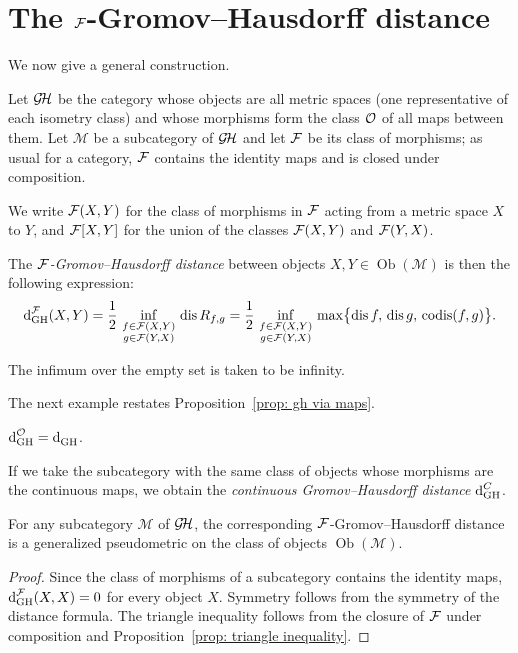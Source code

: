\section{The $\mathcal{F}$-Gromov--Hausdorff distance}\label{sec: f-dist}
We now give a general construction.
\begin{define}\label{definition F distance}
  Let $\operatorname{\mathcal{G\!H}}$ be the category whose objects are all metric spaces (one representative of each isometry class) and whose morphisms form the class $\mathcal{O}$ of all maps between them.
  Let $\mathcal{M}$ be a subcategory of $\operatorname{\mathcal{G\!H}}$ and let $\mathcal{F}$ be its class of morphisms; as usual for a category, $\mathcal{F}$ contains the identity maps and is closed under composition.

We write $\mathcal{F}(X,Y)$ for the class of morphisms in $\mathcal{F}$ acting from a metric space $X$ to $Y$, and $\mathcal{F}[X,Y]$ for the union of the classes $\mathcal{F}(X,Y)$ and $\mathcal{F}(Y,X)$.\par

The \emph{$\mathcal{F}$-Gromov--Hausdorff distance} between objects $X, Y \in \operatorname{Ob}(\mathcal{M})$ is then the following expression:
$$
\operatorname{d}^{\mathcal{F}}_{\mathrm{GH}}(X,Y)=\frac12\,\inf_{\substack{f\in \mathcal{F}(X,Y)\\ g\in \mathcal{F}(Y,X)}}\,\operatorname{dis} R_{f,g}=
\frac12\,\inf_{\substack{f\in \mathcal{F}(X,Y)\\ g\in \mathcal{F}(Y,X)}}\,\max\bigl\{\operatorname{dis} f,\,\operatorname{dis} g,\,\operatorname{codis}(f,g)\bigr\}.
$$

The infimum over the empty set is taken to be infinity.
\end{define}
The next example restates Proposition~\ref{prop: gh via maps}.
\begin{example}
  $\operatorname{d}^{\mathcal{O}}_{\mathrm{GH}} = \operatorname{d}^{}_{\mathrm{GH}}$.
\end{example}
\begin{example}\label{example: continuous distance}
  If we take the subcategory with the same class of objects whose morphisms are the continuous maps, we obtain the \emph{continuous Gromov--Hausdorff distance} $\operatorname{d}^{C}_{\mathrm{GH}}$.
\end{example}
\begin{proposition}
  For any subcategory $\mathcal{M}$ of $\operatorname{\mathcal{G\!H}}$, the corresponding $\mathcal{F}$-Gromov--Hausdorff distance is a generalized pseudometric on the class of objects $\operatorname{Ob}(\mathcal{M})$.
\end{proposition}
\begin{proof}
  Since the class of morphisms of a subcategory contains the identity maps, $\operatorname{d}^{\mathcal{F}}_{\mathrm{GH}}(X,X) = 0$ for every object $X$.
    Symmetry follows from the symmetry of the distance formula.
The triangle inequality follows from the closure of $\mathcal{F}$ under composition and Proposition~\ref{prop: triangle inequality}.
\end{proof}

